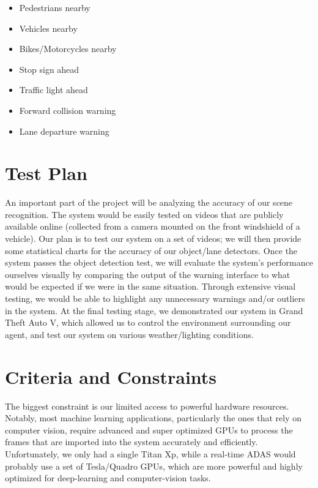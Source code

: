 \begin{itemize}
\item Pedestrians nearby
\item Vehicles nearby
\item Bikes/Motorcycles nearby
\item Stop sign ahead
\item Traffic light ahead
\item Forward collision warning
\item Lane departure warning
\end{itemize}


\pagebreak

\section{Test Plan}

An important part of the project will be analyzing the accuracy of our scene recognition. The system would be easily tested on videos that are publicly available online (collected from a camera mounted on the front windshield of a vehicle). Our plan is to test our system on a set of videos; we will then provide some statistical charts for the accuracy of our object/lane detectors. Once the system passes the object detection test, we will evaluate the system's performance ourselves visually by comparing the output of the warning interface to what would be expected if we were in the same situation. Through extensive visual testing, we would be able to highlight any unnecessary warnings and/or outliers in the system. At the final testing stage, we demonstrated our system in Grand Theft Auto V, which allowed us to control the environment surrounding our agent, and test our system on various weather/lighting conditions.



\section{Criteria and Constraints}

The biggest constraint is our limited access to powerful hardware resources. Notably, most machine learning applications, particularly the ones that rely on computer vision, require advanced and super optimized GPUs to process the frames that are imported into the system accurately and efficiently. Unfortunately, we only had a single Titan Xp, while a real-time ADAS would probably use a set of Tesla/Quadro GPUs, which are more powerful and highly optimized for deep-learning and computer-vision tasks.

